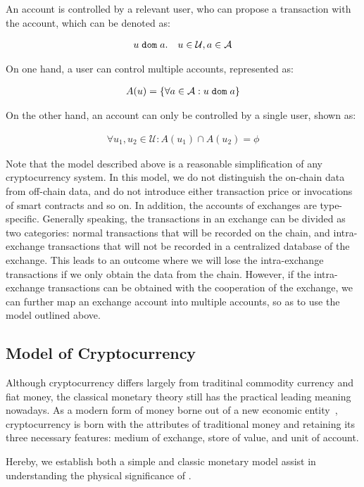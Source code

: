 An account is controlled by a relevant user, who can propose a transaction with the account, which can be denoted as:

\begin{align}
u {\; \texttt{dom}\;} a. \quad u\in \mathcal{U}, a\in \mathcal{A}
\end{align}

\noindent On one hand, a user can control multiple accounts, represented as:

\begin{align}
A(u) = \{\forall a\in \mathcal{A} : u {\; \texttt{dom}\;} a\}
\end{align}

\noindent On the other hand, an account can only be controlled by a single user, shown as:

\begin{align}
\forall u_1, u_2 \in \mathcal{U} : A(u_1) \cap A(u_2) = \phi
\end{align}

Note that the model described above is a reasonable simplification of any cryptocurrency system. In this model, we do not distinguish the on-chain data from off-chain data, and do not introduce either transaction price or invocations of smart contracts and so on. In addition, the accounts of exchanges are type-specific. Generally speaking, the transactions in an exchange can be divided as two categories: normal transactions that will be recorded on the chain, and intra-exchange transactions that will not be recorded in a centralized database of the exchange. This leads to an outcome where we will lose the intra-exchange transactions if we only obtain the data from the chain. 
However, if the intra-exchange transactions can be obtained with the cooperation of the exchange, we can further map an exchange account into multiple accounts, so as to use the model outlined above.


\subsection{Model of Cryptocurrency}
Although cryptocurrency differs largely from traditinal commodity currency and fiat money, the classical monetary theory still has the practical leading meaning nowadays. As a modern form of money borne out of a new economic entity~\cite{swan2015blockchain}, cryptocurrency is born with the attributes of traditional money and retaining its three necessary features: medium of exchange, store of value, and unit of account. 

Hereby, we establish both a simple and classic monetary model assist in understanding the physical significance of \nr.

